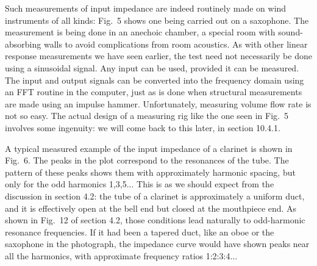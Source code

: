 
  Such measurements of input impedance are indeed routinely made on wind 
  instruments of all kinds: Fig.\ 5 shows one being carried out on a saxophone. 
  The measurement is being done in an anechoic chamber, a special room with 
  sound-absorbing walls to avoid complications from room acoustics. As with 
  other linear response measurements we have seen earlier, the test need not 
  necessarily be done using a sinusoidal signal. Any input can be used, 
  provided it can be measured. The input and output signals can be converted 
  into the frequency domain using an FFT routine in the computer, just as is 
  done when structural measurements are made using an impulse hammer. 
  Unfortunately, measuring volume flow rate is not so easy. The actual design 
  of a measuring rig like the one seen in Fig.\ 5 involves some ingenuity: we 
  will come back to this later, in section 10.4.1. 


  A typical measured example of the input impedance of a clarinet is shown in 
  Fig.\ 6. The peaks in the plot correspond to the resonances of the tube. The 
  pattern of these peaks shows them with approximately harmonic spacing, but 
  only for the odd harmonics 1,3,5... This is as we should expect from the 
  discussion in section 4.2: the tube of a clarinet is approximately a uniform 
  duct, and it is effectively open at the bell end but closed at the mouthpiece 
  end. As shown in Fig.\ 12 of section 4.2, those conditions lead naturally to 
  odd-harmonic resonance frequencies. If it had been a tapered duct, like an 
  oboe or the saxophone in the photograph, the impedance curve would have shown 
  peaks near all the harmonics, with approximate frequency ratios 1:2:3:4... 


